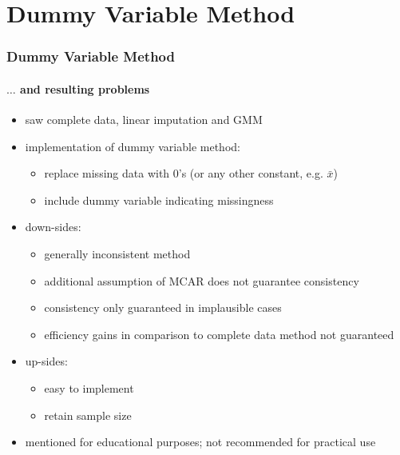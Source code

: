 \documentclass[aspectratio=1610]{beamer}
\begin{document}
\section{Dummy Variable Method}

\begin{frame}
	\frametitle{Dummy Variable Method}
	\framesubtitle{$\ldots$ and resulting problems}
	\begin{itemize}
		\item<1-> saw complete data, linear imputation and GMM
		\item<2-> implementation of dummy variable method:
		\begin{itemize}
			\item<2-> replace missing data with $0$'s (or any other constant, e.g. $\bar{x}$)
			\item<2-> include dummy variable indicating missingness
		\end{itemize}
		\item<3-> down-sides:
		\begin{itemize}
			\item<3-> generally inconsistent method
			\item<3-> additional assumption of MCAR does not guarantee consistency
			\item<3-> consistency only guaranteed in implausible cases
			\item<3-> efficiency gains in comparison to complete data method not guaranteed
		\end{itemize}
		\item<4-> up-sides:
		\begin{itemize}
			\item<4-> easy to implement
			\item<4-> retain sample size
		\end{itemize}
		\item<5-> mentioned for educational purposes; not recommended for practical use
	\end{itemize}
\end{frame}
\end{document}
